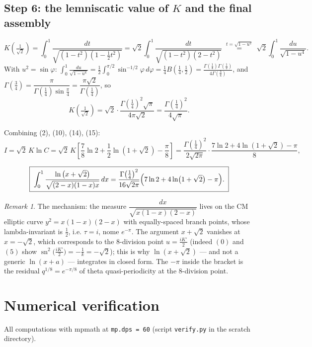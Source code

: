 \documentclass[11pt]{article}
\theoremstyle{remark}
\newtheorem*{remark}{Remark}
\begin{document}
\subsection*{Step 6: the lemniscatic value of $K$ and the final assembly}

\[K\!\left(\tfrac1{\sqrt2}\right)=\int_0^1\frac{dt}{\sqrt{(1-t^2)(1-\frac12 t^2)}}
=\sqrt2\int_0^1\frac{dt}{\sqrt{(1-t^2)(2-t^2)}}
\;\overset{t=\sqrt{1-u^2}}{=}\;\sqrt2\int_0^1\frac{du}{\sqrt{1-u^4}} .\]
With $u^2=\sin\varphi$: $\int_0^1\frac{du}{\sqrt{1-u^4}}=\tfrac12\int_0^{\pi/2}\sin^{-1/2}\varphi\,d\varphi=\tfrac14B\!\left(\tfrac14,\tfrac12\right)=\frac{\Gamma(\frac14)\Gamma(\frac12)}{4\Gamma(\frac34)}$, and $\Gamma(\tfrac34)=\dfrac{\pi}{\Gamma(\frac14)\sin\frac\pi4}=\dfrac{\pi\sqrt2}{\Gamma(\frac14)}$, so
\begin{equation*}
K\!\left(\tfrac1{\sqrt2}\right)=\sqrt2\cdot\frac{\Gamma(\frac14)^2\sqrt\pi}{4\pi\sqrt2}=\frac{\Gamma\!\left(\frac14\right)^2}{4\sqrt\pi}. \tag{15}
\end{equation*}

Combining (2), (10), (14), (15):
\[I=\sqrt2\,K\ln C=\sqrt2\,K\left[\frac78\ln2+\frac12\ln(1+\sqrt2)-\frac\pi8\right]
=\frac{\Gamma\!\left(\frac14\right)^2}{2\sqrt{2\pi}}\cdot\frac{7\ln2+4\ln(1+\sqrt2)-\pi}{8},\]

\[\boxed{\;\int_0^1\frac{\ln\left(x+\sqrt2\right)}{\sqrt{(2-x)(1-x)x}}\,dx
=\frac{\Gamma\!\left(\frac14\right)^2}{16\sqrt{2\pi}}\Bigl(7\ln2+4\ln\bigl(1+\sqrt2\bigr)-\pi\Bigr).\;}\]

\begin{remark}
The mechanism: the measure $\dfrac{dx}{\sqrt{x(1-x)(2-x)}}$ lives on the CM elliptic curve $y^2=x(1-x)(2-x)$ with equally-spaced branch points, whose lambda-invariant is $\tfrac12$, i.e. $\tau=i$, nome $e^{-\pi}$. The argument $x+\sqrt2$ vanishes at $x=-\sqrt2$, which corresponds to the $8$-division point $u=\tfrac{iK'}2$ (indeed $(0)$ and $(5)$ show $\operatorname{sn}^2\bigl(\tfrac{iK'}2\bigr)=-\tfrac1k=-\sqrt2$); this is why $\ln(x+\sqrt2)$ --- and not a generic $\ln(x+a)$ --- integrates in closed form. The $-\pi$ inside the bracket is the residual $q^{1/8}=e^{-\pi/8}$ of theta quasi-periodicity at the $8$-division point.
\end{remark}

\section*{Numerical verification}

All computations with mpmath at \texttt{mp.dps = 60} (script \texttt{verify.py} in the scratch directory).
\end{document}
